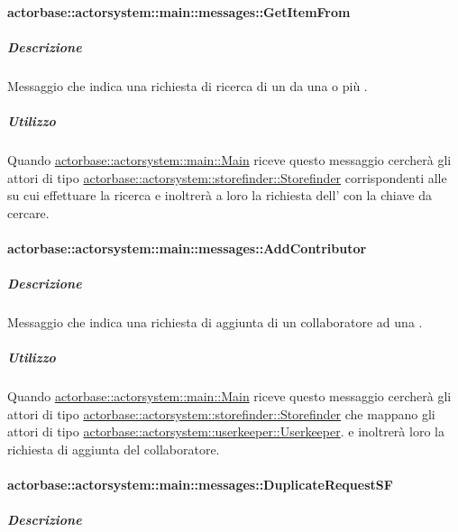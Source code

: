 \documentclass{scalatekids-article}
\begin{document}
\paragraph{actorbase::actorsystem::main::messages::GetItemFrom}
\label{sec:actorbase::actorsystem::main::messages::GetItemFrom}

\subparagraph{Descrizione}

Messaggio che indica una richiesta di ricerca di un  da una o più .

\subparagraph{Utilizzo}

Quando \hyperref[sec:actorbase::actorsystem::main::Main]{actorbase::actorsystem::main::Main}
riceve questo messaggio cercherà gli attori di tipo
\hyperref[sec:actorbase::actorsystem::storefinder::Storefinder]{actorbase::actorsystem::\allowbreak{}storefinder::\allowbreak{}Storefinder}
corrispondenti alle  su cui effettuare la ricerca
e inoltrerà a loro la richiesta dell' con la chiave da cercare.

\paragraph{actorbase::actorsystem::main::messages::AddContributor}
\label{sec:actorbase::actorsystem::main::messages::AddContributor}

\subparagraph{Descrizione}

Messaggio che indica una richiesta di aggiunta di un collaboratore ad una
.

\subparagraph{Utilizzo}

Quando \hyperref[sec:actorbase::actorsystem::main::Main]{actorbase::actorsystem::main::Main}
riceve questo messaggio cercherà gli attori di tipo
\hyperref[sec:actorbase::actorsystem::storefinder::Storefinder]{actorbase::actorsystem::\allowbreak{}storefinder::\allowbreak{}Storefinder}
che mappano gli attori di tipo \hyperref[sec:actorbase::actorsystem::storefinder::Storefinder]{actorbase::actorsystem::\allowbreak{}userkeeper::\allowbreak{}Userkeeper}.
e inoltrerà loro la richiesta di aggiunta del collaboratore.

\paragraph{actorbase::actorsystem::main::messages::DuplicateRequestSF}
\label{sec:actorbase::actorsystem::main::messages::DuplicateRequestSF}

\subparagraph{Descrizione}
\end{document}
